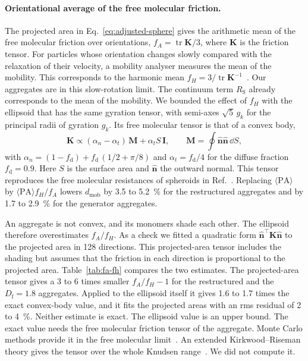 \documentclass[11pt,a4paper]{article}
\newcommand{\Df}{D_\text{f}}
\begin{document}
\paragraph{Orientational average of the free molecular friction.}
The projected area in Eq.~\eqref{eq:adjusted-sphere} gives the arithmetic mean of the free molecular friction over orientations, $f_A = \operatorname{tr}\mathbf{K}/3$, where $\mathbf{K}$ is the friction tensor.
For particles whose orientation changes slowly compared with the relaxation of their velocity, a mobility analyser measures the mean of the mobility.
This corresponds to the harmonic mean $f_H = 3/\operatorname{tr}\mathbf{K}^{-1}$~\cite{dahneke1973a,li2014,mulholland2016}.
Our aggregates are in this slow-rotation limit.
The continuum term $R_\text{S}$ already corresponds to the mean of the mobility.
We bounded the effect of $f_H$ with the ellipsoid that has the same gyration tensor, with semi-axes $\sqrt{5}\,g_k$ for the principal radii of gyration $g_k$.
Its free molecular tensor is that of a convex body,
\begin{equation}
  \mathbf{K} \propto (\alpha_n - \alpha_t)\,\mathbf{M} + \alpha_t S\,\mathbf{I} , \qquad
  \mathbf{M} = \oint \hat{\bm{n}}\hat{\bm{n}}\,\dd{S} ,
  \label{eq:convex-tensor}
\end{equation}
with $\alpha_n = (1 - f_\text{d}) + f_\text{d}\,(1/2 + \pi/8)$ and $\alpha_t = f_\text{d}/4$ for the diffuse fraction $f_\text{d} = 0.9$.
Here $S$ is the surface area and $\hat{\bm{n}}$ the outward normal.
This tensor reproduces the free molecular resistances of spheroids in Ref.~\cite{dahneke1973b}.
Replacing $\langle\text{PA}\rangle$ by $\langle\text{PA}\rangle f_H/f_A$ lowers $d_\text{mob}$ by 3.5 to \SI{5.2}{\percent} for the restructured aggregates and by 1.7 to \SI{2.9}{\percent} for the generator aggregates.

An aggregate is not convex, and its monomers shade each other.
The ellipsoid therefore overestimates $f_A/f_H$.
As a check we fitted a quadratic form $\hat{\bm{n}}^\top \mathbf{K} \hat{\bm{n}}$ to the projected area in 128 directions.
This projected-area tensor includes the shading but assumes that the friction in each direction is proportional to the projected area.
Table~\ref{tab:fa-fh} compares the two estimates.
The projected-area tensor gives a 3 to 6 times smaller $f_A/f_H - 1$ for the restructured and the $\Df = 1.8$ aggregates.
Applied to the ellipsoid itself it gives 1.6 to 1.7 times the exact convex-body value, and it fits the projected areas with an rms residual of 2 to \SI{4}{\percent}.
Neither estimate is exact.
The ellipsoid value is an upper bound.
The exact value needs the free molecular friction tensor of the aggregate.
Monte Carlo methods provide it in the free molecular limit~\cite{mackowski2006}.
An extended Kirkwood--Riseman theory gives the tensor over the whole Knudsen range~\cite{corson2017}.
We did not compute it.
\end{document}

